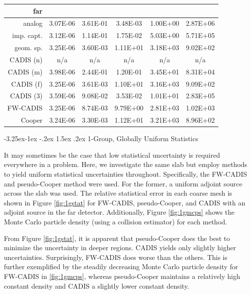 \documentclass[letter,11pt]{article}
\makeatletter
\renewcommand\subsection{\@startsection{subsection}{2}{\z@}%
                                {-3.25ex\@plus -1ex \@minus -.2ex}%
                                {1.5ex \@plus .2ex}%
                                {\normalfont\itshape\bf}}
\makeatother
\begin{document}
\begin{table}[!]
\begin{center}
{\begin{tabular*}{0.90\textwidth}{@{\extracolsep{\fill}} rccccc }
  \midrule 
   {\sc far}   &  & & & & \\
  \midrule
   analog      & 3.07E-06 & 3.61E-01 & 3.48E-03 & 1.00E+00 & 2.87E+06 \\
   imp. capt.  & 3.12E-06 & 1.14E-01 & 1.75E-02 & 5.03E+00 & 5.71E+05 \\
   geom. sp.   & 3.25E-06 & 3.60E-03 & 1.11E+01 & 3.18E+03 & 9.02E+02 \\
   CADIS (n)   &      n/a &      n/a &      n/a &      n/a &  n/a     \\
   CADIS (m)   & 3.98E-06 & 2.44E-01 & 1.20E-01 & 3.45E+01 & 8.31E+04 \\
   CADIS (f)   & 3.25E-06 & 3.61E-03 & 1.10E+01 & 3.16E+03 & 9.09E+02 \\
   CADIS (3)   & 3.59E-06 & 9.08E-02 & 3.53E-02 & 1.01E+01 & 2.83E+05 \\
   FW-CADIS    & 3.25E-06 & 8.74E-03 & 9.79E+00 & 2.81E+03 & 1.02E+03 \\
   Cooper      & 3.24E-06 & 3.30E-03 & 1.12E+01 & 3.21E+03 & 8.96E+02 \\
  \bottomrule 
 \end{tabular*} 
 }
 \end{center} 
 \label{tbl:1g3d}  
\end{table}


\subsection{1-Group, Globally Uniform Statistics}

It may sometimes be the case that low statistical uncertainty is required everywhere in a problem.  Here, we investigate the same slab but employ methods to yield  uniform statistical uncertainties throughout.  Specifically, the FW-CADIS and pseudo-Cooper method were used.  For the former, a uniform adjoint source across the slab was used.  The relative statistical error in each coarse mesh is shown in Figure \ref{fig:1gstat} for FW-CADIS, pseudo-Cooper, and CADIS with an adjoint source in the far detector.  Additionally, Figure \ref{fig:1gmcps} shows the Monte Carlo particle density (using a collision estimator) for each method.  

From Figure \ref{fig:1gstat}, it is apparent that pseudo-Cooper does the best to minimize the uncertainty in deeper regions.  CADIS yields only slightly higher uncertainties.  Surprisingly, FW-CADIS does worse than the others.  This is further exemplified by the steadily decreasing Monte Carlo particle density for FW-CADIS in \ref{fig:1gmcps}, whereas pseudo-Cooper maintains a relatively high constant density and CADIS a slightly lower constant density.
\end{document}
